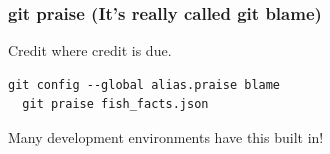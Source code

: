\documentclass{beamer}
\begin{document}
\begin{frame}[fragile]

\frametitle{git praise (It's really called git blame)}

Credit where credit is due.

\vspace{1em}

\begin{lstlisting}[frame=single]
  git config --global alias.praise blame
  git praise fish_facts.json
\end{lstlisting}

\vspace{1em}

Many development environments have this built in!

\end{frame}
\end{document}
